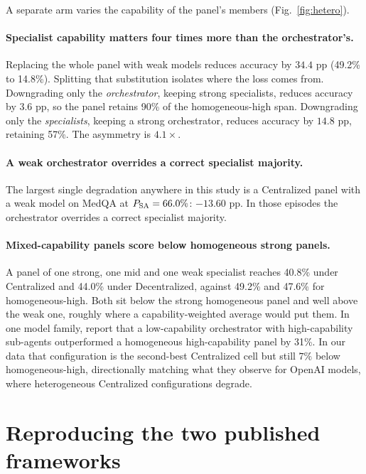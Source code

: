 A separate arm varies the capability of the panel's members (Fig.~\ref{fig:hetero}).

\paragraph{Specialist capability matters four times more than the orchestrator's.}
Replacing the whole panel with weak models reduces accuracy by $34.4$ pp (49.2\% to 14.8\%). Splitting that
substitution isolates where the loss comes from. Downgrading only the \emph{orchestrator}, keeping
strong specialists, reduces accuracy by $3.6$ pp, so the panel retains 90\% of the homogeneous-high span.
Downgrading only the \emph{specialists}, keeping a strong orchestrator, reduces accuracy by $14.8$ pp, retaining
57\%. The asymmetry is $4.1\times$.

\paragraph{A weak orchestrator overrides a correct specialist majority.}
The largest single degradation anywhere in this study is a Centralized panel with a weak model on
MedQA at $P_{\mathrm{SA}} = 66.0\%$: $-13.60$ pp. In those episodes the orchestrator overrides a correct
specialist majority.

\paragraph{Mixed-capability panels score below homogeneous strong panels.}
A panel of one strong, one mid and one weak specialist reaches 40.8\% under Centralized and 44.0\%
under Decentralized, against 49.2\% and 47.6\% for homogeneous-high. Both sit below the strong
homogeneous panel and well above the weak one, roughly where a capability-weighted average would
put them. In one model family, \citet{kim2026scaling} report that a low-capability orchestrator with
high-capability sub-agents outperformed a homogeneous high-capability panel by 31\%. In our data
that configuration is the second-best Centralized cell but still $7\%$ below homogeneous-high,
directionally matching what they observe for OpenAI models, where heterogeneous Centralized
configurations degrade.

\section{Reproducing the two published frameworks}
\label{app:frameworks}


